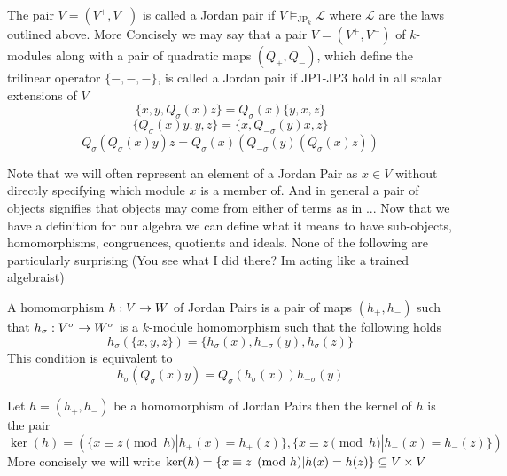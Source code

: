 \begin{definition}
    The pair $V=(V^+,V^-)$ is called a Jordan pair if $V\vDash_{\text{JP}_k}\mathcal{L}$ where $\mathcal{L}$ 
    are the laws outlined above. More Concisely we may say that a pair $V=(V^+,V^-)$ of $k$-modules
    along with a pair of quadratic maps $(Q_+,Q_-)$, which define the trilinear operator $\{-,-,-\}$, 
    is called a Jordan pair if JP1-JP3 hold in all scalar extensions of $V$
    \begin{equation}
        \tag{JP1}
        \{x,y,Q_\sigma(x)z\}=Q_\sigma(x)\{y,x,z\}
    \end{equation}
    \begin{equation}
        \tag{JP2}
        \{Q_\sigma(x)y,y,z\}=\{x,Q_{-\sigma}(y)x,z\}
    \end{equation}
    \begin{equation}
        \tag{JP3}
        Q_{\sigma}(Q_{\sigma}(x)y)z=Q_{\sigma}(x)(Q_{-\sigma}(y)(Q_{\sigma}(x)z))
    \end{equation}
\end{definition}
Note that we will often represent an element of a Jordan Pair as $x\in V$ without directly 
specifying which module $x$ is a member of. And in general a pair of objects signifies that 
objects may come from either of terms as in ...
Now that we have a definition for our algebra we can define what it means to have sub-objects, 
homomorphisms, congruences, quotients and ideals. None of the following are particularly surprising (You see what I did there? Im acting like a trained algebraist)
\begin{definition}
    A homomorphism $h:V\rightarrow W$ of Jordan Pairs is a pair of maps $(h_+,h_-)$ such that $h_\sigma:V^\sigma\rightarrow W^\sigma$ is a 
    $k$-module homomorphism such that the following holds
    \begin{equation}
        h_{\sigma}(\{x,y,z\})=\{h_{\sigma}(x),h_{-\sigma}(y),h_{\sigma}(z)\}
    \end{equation}
    This condition is equivalent to 
    \begin{equation}
        h_{\sigma}(Q_{\sigma}(x)y)=Q_{\sigma}(h_{\sigma}(x))h_{-\sigma}(y)
    \end{equation}
\end{definition}


\begin{definition}
    Let $h=(h_+,h_-)$ be a homomorphism of Jordan Pairs then the kernel of $h$ is the pair 
    $\ker(h)=(\{x\equiv z \pmod h | h_+(x)=h_+(z)\},\{x\equiv z \pmod h | h_-(x)=h_-(z)\})$
    More concisely we will write $\ker(h)=\{x\equiv z \pmod h | h(x)=h(z)\}\subseteq V\times V$
\end{definition}

